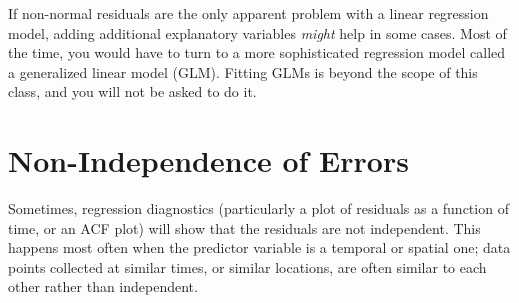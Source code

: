 \documentclass[twoside]{book}\usepackage[]{graphicx}\usepackage[]{xcolor}
\begin{document}
If non-normal residuals are the only apparent problem with a linear regression model, adding additional explanatory variables \emph{might} help in some cases.  Most of the time, you would have to turn to a more sophisticated regression model called a generalized linear model (GLM).  Fitting GLMs is beyond the scope of this class, and you will not be asked to do it.

\section{Non-Independence of Errors}
Sometimes, regression diagnostics (particularly a plot of residuals as a function of time, or an ACF plot) will show that the residuals are not independent.  This happens most often when the predictor variable is a temporal or spatial one; data points collected at similar times, or similar locations, are often similar to each other rather than independent.
\end{document}
